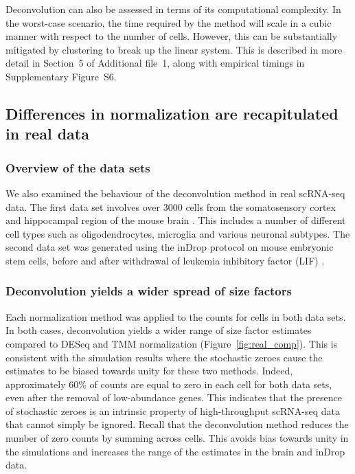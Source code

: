 \documentclass{bmcart}
\newcommand{\supptimecomp}{5}
\newcommand{\supptimings}{S6}
\newcommand{\revised}[1]{#1}
\begin{document}
\revised{Deconvolution can also be assessed in terms of its computational complexity.
In the worst-case scenario, the time required by the method will scale in a cubic manner with respect to the number of cells.
However, this can be substantially mitigated by clustering to break up the linear system.
This is described in more detail in Section~\supptimecomp{} of Additional file~1, along with empirical timings in Supplementary Figure~\supptimings{}.}

\subsection*{Differences in normalization are recapitulated in real data}

\subsubsection*{Overview of the data sets}
We also examined the behaviour of the deconvolution method in real scRNA-seq data.
The first data set involves over 3000 cells from the somatosensory cortex and hippocampal region of the mouse brain \cite{zeisel2015brain}.
This includes a number of different cell types such as oligodendrocytes, microglia and various neuronal subtypes.
The second data set was generated using the inDrop protocol on mouse embryonic stem cells, before and after withdrawal of leukemia inhibitory factor (LIF) \cite{klein2015droplet}.

\subsubsection*{Deconvolution yields a wider spread of size factors}
Each normalization method was applied to the counts for cells in both data sets.
In both cases, deconvolution yields a wider range of size factor estimates compared to DESeq and TMM normalization (Figure~\ref{fig:real_comp}).
This is consistent with the simulation results where the stochastic zeroes cause the estimates to be biased towards unity for these two methods.
Indeed, approximately 60\% of counts are equal to zero in each cell for both data sets, even after the removal of low-abundance genes.
This indicates that the presence of stochastic zeroes is an intrinsic property of high-throughput scRNA-seq data that cannot simply be ignored.
Recall that the deconvolution method reduces the number of zero counts by summing across cells.
This avoids bias towards unity in the simulations and increases the range of the estimates in the brain and inDrop data.
\end{document}
